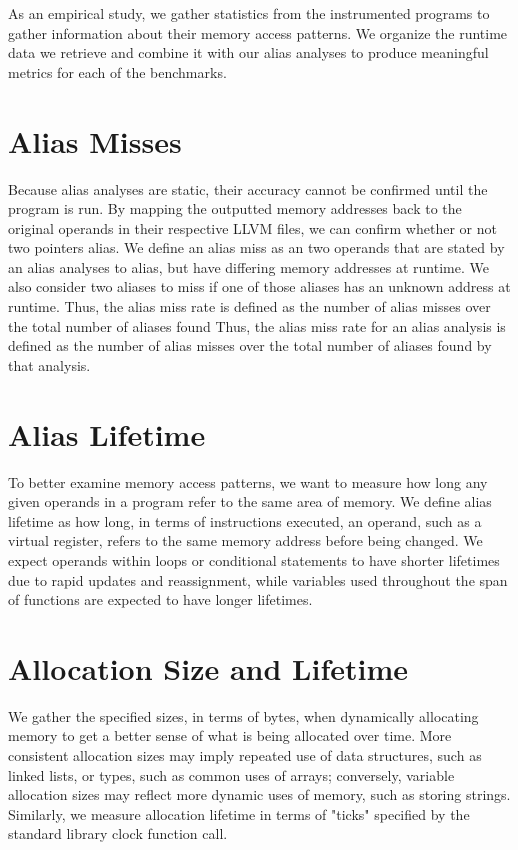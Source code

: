 As an empirical study, we gather statistics from the instrumented programs to gather information about their memory access patterns. We organize the runtime data we retrieve and combine it with our alias analyses to produce meaningful metrics for each of the benchmarks.

\section{Alias Misses}
Because alias analyses are static, their accuracy cannot be confirmed until the program is run. By mapping the outputted memory addresses back to the original operands in their respective LLVM files, we can confirm whether or not two pointers alias. We define an alias miss as an two operands that are stated by an alias analyses to alias, but have differing memory addresses at runtime. We also consider two aliases to miss if one of those aliases has an unknown address at runtime. Thus, the alias miss rate is defined as the number of alias misses over the total number of aliases found Thus, the alias miss rate for an alias analysis is defined as the number of alias misses over the total number of aliases found by that analysis.

\section{Alias Lifetime}
To better examine memory access patterns, we want to measure how long any given operands in a program refer to the same area of memory. We define alias lifetime as how long, in terms of instructions executed, an operand, such as a virtual register, refers to the same memory address before being changed. We expect operands within loops or conditional statements to have shorter lifetimes due to rapid updates and reassignment, while variables used throughout the span of functions are expected to have longer lifetimes.

\section{Allocation Size and Lifetime}
We gather the specified sizes, in terms of bytes, when dynamically allocating memory to get a better sense of what is being allocated over time. More consistent allocation sizes may imply repeated use of data structures, such as linked lists, or types, such as common uses of arrays; conversely, variable allocation sizes may reflect more dynamic uses of memory, such as storing strings. Similarly, we measure allocation lifetime in terms of "ticks" specified by the standard library clock function call.
